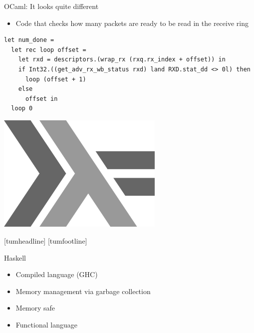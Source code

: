 \documentclass[NET,english,aspectratio=169,notitleframe]{tumbeamer}
\begin{document}
\begin{frame}[fragile]{OCaml: It looks quite different}
\begin{itemize}
\item Code that checks how many packets are ready to be read in the receive ring
\end{itemize}
\begin{verbatim}
let num_done =
  let rec loop offset =
    let rxd = descriptors.(wrap_rx (rxq.rx_index + offset)) in
    if Int32.((get_adv_rx_wb_status rxd) land RXD.stat_dd <> 0l) then
      loop (offset + 1)
    else
      offset in
  loop 0
\end{verbatim}
\end{frame}




\begin{frame}{}
\centering\includegraphics[width=0.6\textwidth]{pics/haskell}
\end{frame}
[tumheadline]
[tumfootline]

\begin{frame}{Haskell}
\begin{itemize}
\item Compiled language (GHC)
\item Memory management via garbage collection
\item Memory safe
\item Functional language
\end{itemize}
\end{frame}
\end{document}
